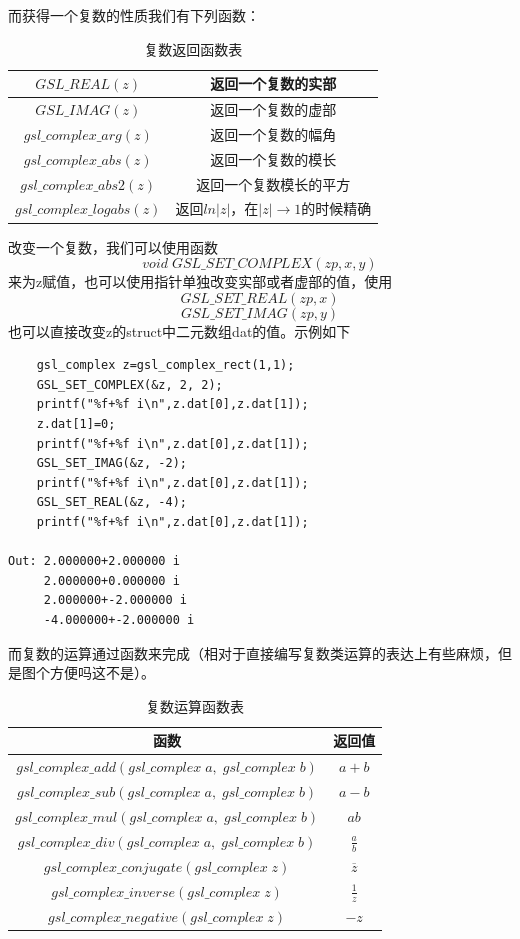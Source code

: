 \documentclass[a4paper,11pt,onecolumn,twoside]{article}
\begin{document}
而获得一个复数的性质我们有下列函数：
\begin{table}
\centering
\renewcommand\arraystretch{2}
\caption{复数返回函数表}
\begin{tabular}{|c|c|}
\hline
$GSL\_REAL(z)$&返回一个复数的实部\\\hline
$GSL\_IMAG(z)$&返回一个复数的虚部\\\hline
$gsl\_complex\_arg(z)$&返回一个复数的幅角\\\hline
$gsl\_complex\_abs(z)$&返回一个复数的模长\\\hline
$gsl\_complex\_abs2(z)$&返回一个复数模长的平方\\\hline
$gsl\_complex\_logabs(z)$&返回$ln|z|$，在$|z|\to1$的时候精确\\\hline
\end{tabular}
\end{table}

改变一个复数，我们可以使用函数
$$
void \; GSL\_SET\_COMPLEX(zp, x, y)
$$
来为z赋值，也可以使用指针单独改变实部或者虚部的值，使用
$$
GSL\_SET\_REAL(zp, x)
$$
$$
GSL\_SET\_IMAG(zp, y)
$$
也可以直接改变z的struct中二元数组dat的值。示例如下
\begin{lstlisting}
    gsl_complex z=gsl_complex_rect(1,1);
    GSL_SET_COMPLEX(&z, 2, 2);
    printf("%f+%f i\n",z.dat[0],z.dat[1]);
    z.dat[1]=0;
    printf("%f+%f i\n",z.dat[0],z.dat[1]);
    GSL_SET_IMAG(&z, -2);
    printf("%f+%f i\n",z.dat[0],z.dat[1]);
    GSL_SET_REAL(&z, -4);
    printf("%f+%f i\n",z.dat[0],z.dat[1]);

Out: 2.000000+2.000000 i
     2.000000+0.000000 i
     2.000000+-2.000000 i
     -4.000000+-2.000000 i
\end{lstlisting}

而复数的运算通过函数来完成（相对于直接编写复数类运算的表达上有些麻烦，但是图个方便吗这不是）。
\newpage

\begin{table}
\centering
\renewcommand\arraystretch{2}
\caption{复数运算函数表}
\begin{tabular}{|c|c|}
\hline
函数&返回值\\\hline
$gsl\_complex\_add(gsl\_complex\;a,\;gsl\_complex\;b)$&$a+b$\\\hline
$gsl\_complex\_sub(gsl\_complex\;a,\;gsl\_complex\;b)$&$a-b$\\\hline
$gsl\_complex\_mul(gsl\_complex\;a,\;gsl\_complex\;b)$&$ab$\\\hline
$gsl\_complex\_div(gsl\_complex\;a,\;gsl\_complex\;b)$&$\frac{a}{b}$\\\hline
$gsl\_complex\_conjugate(gsl\_complex\;z)$&$\overline{z}$\\\hline
$gsl\_complex\_inverse(gsl\_complex\;z)$&$\frac{1}{z}$\\\hline
$gsl\_complex\_negative(gsl\_complex\;z)$&$-z$\\\hline
\end{tabular}
\end{table}
\end{document}
